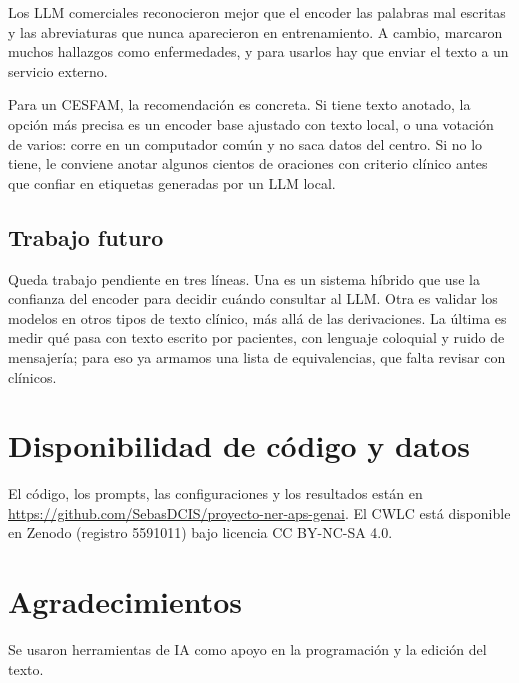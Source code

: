 \documentclass[10pt,journal,a4paper]{IEEEtran}
\begin{document}
Los LLM comerciales reconocieron mejor que el encoder las palabras mal escritas y las abreviaturas que nunca aparecieron en entrenamiento. A cambio, marcaron muchos hallazgos como enfermedades, y para usarlos hay que enviar el texto a un servicio externo.

Para un CESFAM, la recomendación es concreta. Si tiene texto anotado, la opción más precisa es un encoder base ajustado con texto local, o una votación de varios: corre en un computador común y no saca datos del centro. Si no lo tiene, le conviene anotar algunos cientos de oraciones con criterio clínico antes que confiar en etiquetas generadas por un LLM local.

\subsection*{Trabajo futuro}

Queda trabajo pendiente en tres líneas. Una es un sistema híbrido que use la confianza del encoder para decidir cuándo consultar al LLM. Otra es validar los modelos en otros tipos de texto clínico, más allá de las derivaciones. La última es medir qué pasa con texto escrito por pacientes, con lenguaje coloquial y ruido de mensajería; para eso ya armamos una lista de equivalencias, que falta revisar con clínicos.

\section*{Disponibilidad de c\'odigo y datos}
El código, los prompts, las configuraciones y los resultados están en \url{https://github.com/SebasDCIS/proyecto-ner-aps-genai}. El CWLC está disponible en Zenodo (registro 5591011) bajo licencia CC BY-NC-SA 4.0.

\section*{Agradecimientos}
Se usaron herramientas de IA como apoyo en la programación y la edición del texto.



\end{document}
